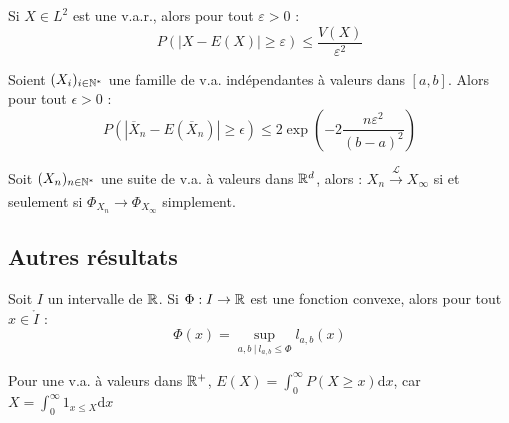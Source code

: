 \documentclass[11pt,a4paper]{article}
\begin{document}
\begin{corstar}
 Si $X\in L^2$ est une v.a.r., alors pour tout $\varepsilon >0$ :
\[P(|X-E(X)| \geq \varepsilon) \leq \frac{V(X)}{\varepsilon^2}\]
\end{corstar}

\begin{propstar}
Soient $(X_i)_{i\in \mathbb N^*}$ une famille de v.a. indépendantes à valeurs dans $[a,b]$. Alors pour tout $\epsilon > 0$ :
\[P( |\overline{X}_n - E(\overline{X}_n) | \geq \epsilon) \leq 2 \exp(-2\frac{n\varepsilon^2}{(b-a)^2})\]
\end{propstar}

\begin{thmstar}
[Lévy] Soit $(X_n)_{n\in \mathbb N^*}$ une suite de v.a. à valeurs dans $\mathbb R^d$, alors : $X_n \xrightarrow[]{\mathcal{L}} X_\infty$ si et seulement si $\Phi_{X_n} \to \Phi_{X_\infty}$ simplement.
\end{thmstar}
\subsection*{Autres résultats}

\begin{lemmastar}
Soit $I$ un intervalle de $\mathbb R$. Si $ \Phi :I \to \mathbb R$ est une fonction convexe, alors pour tout $x\in \mathring{I}$ :
\[\Phi(x) = \sup_{a,b \ | \ l_{a,b} \leq \Phi } l_{a,b}(x)\]
\end{lemmastar}

\begin{lemmastar}
Pour une v.a. à valeurs dans $\mathbb R^+$, $\displaystyle E(X)=\int_0^\infty P(X \geq x) \mathrm{d}x$, car $\displaystyle X=\int_0^\infty 1_{x\leq X} \mathrm{d}x$
\end{lemmastar} 
\end{document}
